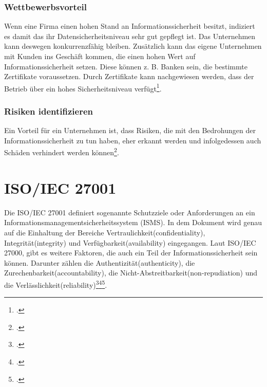 \subsubsection{Wettbewerbsvorteil}
Wenn eine Firma einen hohen Stand an Informationssicherheit besitzt, indiziert es damit das ihr Datensicherheitsniveau sehr gut gepflegt ist. Das Unternehmen kann deswegen konkurrenzfähig bleiben. Zusätzlich kann das eigene Unternehmen mit Kunden ins Geschäft kommen, die einen hohen Wert auf Informationssicherheit setzen. Diese können z. B. Banken sein, die bestimmte Zertifikate voraussetzen.
Durch Zertifikate kann nachgewiesen werden, dass der Betrieb über ein hohes Sicherheitsniveau verfügt\footcite{Lehrunterlagen-HTL-cloud}.


\subsubsection{Risiken identifizieren}
Ein Vorteil für ein Unternehmen ist, dass Risiken, die mit den Bedrohungen der Informationssicherheit zu tun haben, eher erkannt werden und infolgedessen auch Schäden verhindert werden können\footcite{Lehrunterlagen-HTL-cloud}.


\section{ISO/IEC 27001}
Die ISO/IEC 27001 definiert sogenannte Schutzziele oder Anforderungen an ein Informationsmanagementsicherheitssystem (ISMS). In dem Dokument wird genau auf die Einhaltung der Bereiche Vertraulichkeit(confidentiality), Integrität(integrity) und Verfügbarkeit(availability) eingegangen. Laut ISO/IEC 27000, gibt es weitere Faktoren, die auch ein Teil der Informationssicherheit sein können. Darunter zählen die Authentizität(authenticity), die Zurechenbarkeit(accountability), die Nicht-Abstreitbarkeit(non-repudiation) und die Verlässlichkeit(reliability)\footcite{Lehrunterlagen-HTL-cloud}\footcite{schutzziele-iso27001-bsi}\footcite{schutzziele-iso27001}.


